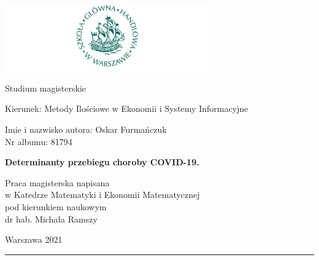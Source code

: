 \documentclass[polish, twoside, 12pt, a4paper]{article}
\theoremstyle{definition}
\theoremstyle{plain}
\theoremstyle{remark}
\begin{document}
\begin{titlepage}
\centering

\includegraphics[width=0.66\textwidth]{logo.JPG}

\vspace*{0.5cm}
Studium magisterskie\\
\begin{flushleft}
Kierunek: Metody Ilościowe w Ekonomii i Systemy Informacyjne\\
\end{flushleft}

\vspace*{.5cm}
\rule{0cm}{1cm}\hfill
\begin{minipage}{9cm}
Imie i nazwisko autora: Oskar Furmańczuk\\
Nr albumu: 81794
\end{minipage}

\vspace*{1cm}
\begin{minipage}{12cm}
\centering
\Large
\textbf{Determinanty przebiegu choroby COVID-19.}
\end{minipage}

\vspace*{2cm}
\rule{0cm}{1cm}\hfill
\begin{minipage}{9cm}
Praca magisterska napisana\\
w Katedrze Matematyki i Ekonomii Matematycznej\\
pod kierunkiem naukowym\\
dr hab. Michała Ramszy
\end{minipage}

\vfill
Warszawa 2021
\end{titlepage}

\rule{1ex}{0ex}\clearpage

\graphicspath{ {./images/} }
\cleardoublepage
\tableofcontents

\cleardoublepage
\end{document}
